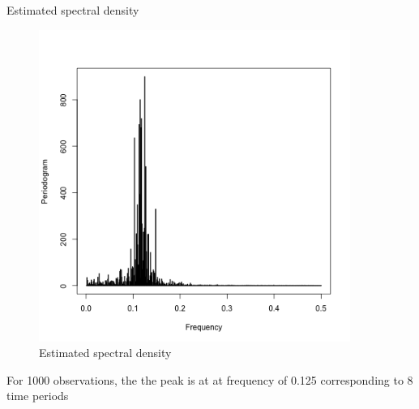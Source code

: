 \documentclass[11pt, oneside]{article}   	%
\begin{document}
Estimated spectral density
\begin{figure}[H] %
   \centering
   \includegraphics[width=4in]{../code/estimatedSpecralDensity1000.png} 
   \caption{Estimated spectral density}
   \label{fig:es1000}
\end{figure}
\justify
For 1000 observations, the the peak is at at frequency of 0.125 corresponding to 8 time periods
\end{document}
